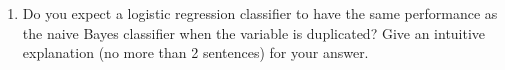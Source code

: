 \begin{enumerate}
\begin{enumerate}
  \item \relax[2 points] Do you expect a logistic regression
    classifier to have the same performance as the naive Bayes
    classifier when the variable is duplicated? Give an intuitive
    explanation (no more than 2 sentences) for your answer.

  \end{enumerate}

\end{enumerate}




